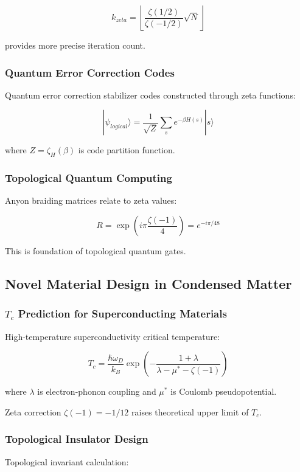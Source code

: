\documentclass[12pt,a4paper]{article}
\begin{document}
$$k_{zeta} = \left\lfloor \frac{\zeta(1/2)}{\zeta(-1/2)}\sqrt{N} \right\rfloor$$

provides more precise iteration count.

\subsubsection{Quantum Error Correction Codes}

Quantum error correction stabilizer codes constructed through zeta functions:

$$|\psi_{logical}\rangle = \frac{1}{\sqrt{Z}} \sum_{s} e^{-\beta H(s)} |s\rangle$$

where $Z = \zeta_H(\beta)$ is code partition function.

\subsubsection{Topological Quantum Computing}

Anyon braiding matrices relate to zeta values:

$$R = \exp\left(i\pi \frac{\zeta(-1)}{4}\right) = e^{-i\pi/48}$$

This is foundation of topological quantum gates.

\subsection{Novel Material Design in Condensed Matter}

\subsubsection{$T_c$ Prediction for Superconducting Materials}

High-temperature superconductivity critical temperature:

$$T_c = \frac{\hbar\omega_D}{k_B} \exp\left(-\frac{1+\lambda}{\lambda - \mu^* - \zeta(-1)}\right)$$

where $\lambda$ is electron-phonon coupling and $\mu^*$ is Coulomb pseudopotential.

Zeta correction $\zeta(-1) = -1/12$ raises theoretical upper limit of $T_c$.

\subsubsection{Topological Insulator Design}

Topological invariant calculation:
\end{document}
